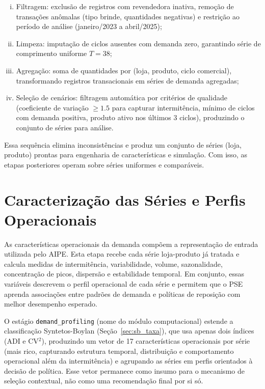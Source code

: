 \begin{enumerate}[(i)]
  \item Filtragem: exclusão de registros com revendedora inativa, remoção de transações anômalas (tipo brinde, quantidades negativas) e restrição ao período de análise (janeiro/2023 a abril/2025);

  \item Limpeza: imputação de ciclos ausentes com demanda zero, garantindo série de comprimento uniforme $T=38$;

  \item Agregação: soma de quantidades por (loja, produto, ciclo comercial), transformando registros transacionais em séries de demanda agregadas;

  \item Seleção de cenários: filtragem automática por critérios de qualidade (coeficiente de variação $\geq 1.5$ para capturar intermitência, mínimo de ciclos com demanda positiva, produto ativo nos últimos 3 ciclos), produzindo o conjunto de séries para análise.
\end{enumerate}

Essa sequência elimina inconsistências e produz um conjunto de séries (loja, produto) prontas para engenharia de características e simulação. Com isso, as etapas posteriores operam sobre séries uniformes e comparáveis.

\section{Caracterização das Séries e Perfis Operacionais}
\label{sec:carac_series}

As características operacionais da demanda compõem a representação de entrada utilizada pelo AIPE. Esta etapa recebe cada série loja-produto já tratada e calcula medidas de intermitência, variabilidade, volume, sazonalidade, concentração de picos, dispersão e estabilidade temporal. Em conjunto, essas variáveis descrevem o perfil operacional de cada série e permitem que o PSE aprenda associações entre padrões de demanda e políticas de reposição com melhor desempenho esperado.

O estágio \texttt{demand\_profiling} (nome do módulo computacional) estende a classificação Syntetos-Boylan (Seção~\ref{sec:sb_taxa}), que usa apenas dois índices (ADI e CV$^2$), produzindo um vetor de 17 características operacionais por série (mais rico, capturando estrutura temporal, distribuição e comportamento operacional além da intermitência) e agrupando as séries em perfis orientados à decisão de política. Esse vetor permanece como insumo para o mecanismo de seleção contextual, não como uma recomendação final por si só.

